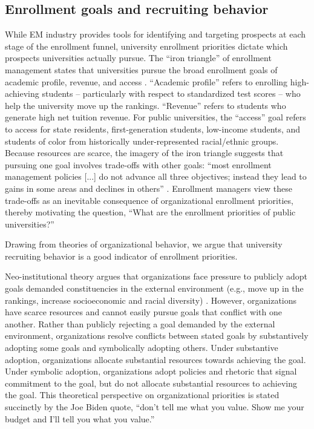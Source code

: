 \documentclass[twoside]{article}
\begin{document}
\subsection*{Enrollment goals and recruiting behavior}

While EM industry provides tools for identifying and targeting prospects at each stage of the enrollment funnel, university enrollment priorities dictate which prospects universities actually pursue.  The ``iron triangle'' of enrollment management states that universities pursue the broad enrollment goals of academic profile, revenue, and access \citep{RN2772}. ``Academic profile'' refers to enrolling high-achieving students -- particularly with respect to standardized test scores -- who help the university move up the rankings. ``Revenue'' refers to students who generate high net tuition revenue.  For public universities, the ``access'' goal refers to access for state residents, first-generation students, low-income students, and students of color from historically under-represented racial/ethnic groups. Because resources are scarce, the imagery of the iron triangle suggests that pursuing one goal involves trade-offs with other goals: ``most enrollment management policies [...] do not advance all three objectives; instead they lead to gains in some areas and declines in others'' \citep[p.~221]{RN2772}. Enrollment managers view these trade-offs as an inevitable consequence of organizational enrollment priorities, thereby motivating the question, ``What are the enrollment priorities of public universities?''

Drawing from theories of organizational behavior, we argue that university recruiting behavior is a good indicator of enrollment priorities.  

Neo-institutional theory argues that organizations face pressure to publicly adopt goals demanded constituencies in the external environment (e.g., move up in the rankings, increase socioeconomic and racial diversity) \citep{RN513,RN527}. However, organizations have scarce resources and cannot easily pursue goals that conflict with one another.  Rather than publicly rejecting a goal demanded by the external environment, organizations resolve conflicts between stated goals by substantively adopting some goals and symbolically adopting others.  Under substantive adoption, organizations allocate substantial resources towards achieving the goal.  Under symbolic adoption, organizations adopt policies and rhetoric that signal commitment to the goal, but do not allocate substantial resources to achieving the goal.  This theoretical perspective on organizational priorities is stated succinctly by the Joe Biden quote, ``don’t tell me what you value. Show me your budget and I’ll tell you what you value.''  
\end{document}
